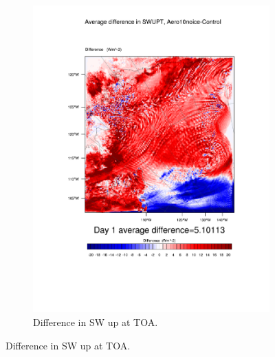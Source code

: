 \begin{figure}
\begin{subfigure}{0.48\textwidth}
		\includegraphics[width=\textwidth]{results/aero10ni/diff_Aero10NoIce_SWUPT_Day1.pdf}
		\caption{Difference in SW up at TOA.}
		\label{subfig:swup_r4Day1}
	\end{subfigure}
	

\end{figure}
